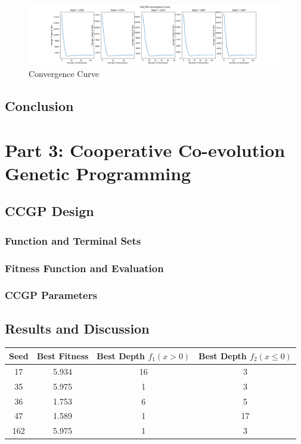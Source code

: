 \documentclass{article}
\begin{document}
\begin{figure}[h!]
	\centering
	\includegraphics[width=\linewidth]{knapsack_100_995.png}
	\caption{Convergence Curve}
\end{figure}

\subsection*{Conclusion}

\section*{Part 3: Cooperative Co-evolution Genetic Programming}
\subsection*{CCGP Design}
\subsubsection*{Function and Terminal Sets}
\subsubsection*{Fitness Function and Evaluation}
\subsubsection*{CCGP Parameters}
\subsection*{Results and Discussion}

\begin{tabular}{|c|c|c|c|}
	\hline
	Seed & Best Fitness & Best Depth $f_1(x > 0)$ & Best Depth $f_2(x \le 0)$ \\
	\hline
	17 & 5.934 & 16 & 3 \\
	\hline
	35 & 5.975 & 1 & 3 \\
	\hline
	36 & 1.753 & 6 & 5 \\
	\hline
	47 & 1.589 & 1 & 17 \\
	\hline
	162 & 5.975 & 1 & 3 \\
	\hline
\end{tabular}
\end{document}
